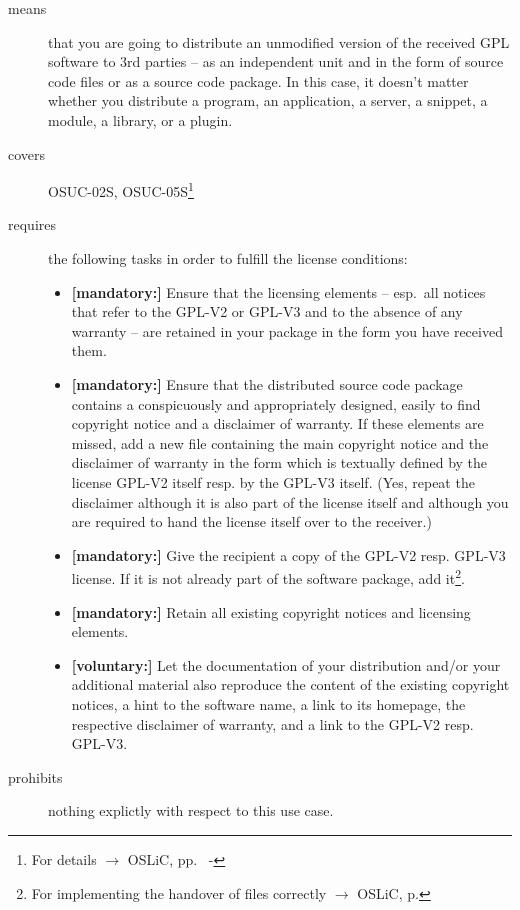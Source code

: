 \begin{description}

\item[means] that you are going to distribute an unmodified version of the
received GPL software to 3rd parties -- as an independent unit and in the form
of source code files or as a source code package. In this case, it doesn't
matter whether you distribute a program, an application, a server, a snippet, a
module, a library, or a plugin.

\item[covers] OSUC-02S, OSUC-05S\footnote{For details $\rightarrow$
OSLiC, pp.\ \pageref{OSUC-02S-DEF} - \pageref{OSUC-05S-DEF}}

\item[requires] the following tasks in order to fulfill the license conditions:
\begin{itemize}
 
  \item \textbf{[mandatory:]} Ensure that the licensing elements -- esp.\ all
  notices that refer to the GPL-V2 or GPL-V3 and to the absence of any
  warranty -- are retained in your package in the form you have received them.

  \item \textbf{[mandatory:]} Ensure that the distributed source code package
  contains a conspicuously and appropriately designed, easily to find copyright
  notice and a disclaimer of warranty. If these elements are missed, add a new
  file containing the main copyright notice and the disclaimer of warranty in the
  form which is textually defined by the license GPL-V2 itself resp. by the
  GPL-V3 itself. (Yes, repeat the disclaimer although it is also part of the
  license itself and although you are required to hand the license itself over
  to the receiver.)
  
  \item \textbf{[mandatory:]} Give the recipient a copy of the GPL-V2 resp.
  GPL-V3 license. If it is not already part of the software package, add
  it\footnote{For implementing the handover of files correctly $\rightarrow$
  OSLiC, p. \pageref{DistributingFilesHint}}.

  \item \textbf{[mandatory:]} Retain all existing copyright notices and
  licensing elements.
    
  \item \textbf{[voluntary:]} Let the documentation of your distribution and/or
  your additional material also reproduce the content of the existing
  copyright notices, a hint to the software name, a link to its homepage,
  the respective disclaimer of warranty, and a link to the GPL-V2 resp.
  GPL-V3.

\end{itemize}

\item[prohibits] nothing explictly with respect to this use case.

\end{description}


